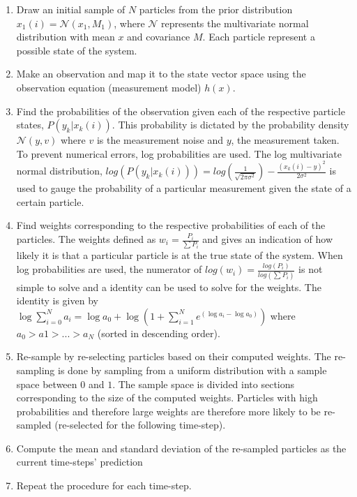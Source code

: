 \begin{enumerate}
	\item Draw an initial sample of $N$ particles from the prior distribution $x_1(i) = \mathcal{N}(x_1,M_1)$, where $\mathcal{N}$ represents the multivariate normal distribution with mean $x$ and covariance $M$. Each particle represent a possible state of the system. 
	\item Make an observation and map it to the state vector space using the observation equation (measurement model) $h(x)$.
	\item Find the probabilities of the observation given each of the respective particle states, $P(y_k | x_k(i))$. This probability is dictated by the probability density $\mathcal{N}(y,v)$ where $v$ is the measurement noise and $y$, the measurement taken. To prevent numerical errors, log probabilities are used. The log multivariate normal distribution, $log(P(y_k|x_k(i)))=log(\frac{1}{\sqrt{2\pi \sigma ^2}}) - \frac{(x_k(i)-y)^2}{2\sigma^2}$ is used to gauge the probability of a particular measurement given the state of a certain particle.
	\item \label{initially} Find weights corresponding to the respective probabilities of each of the particles. The weights defined as $w_i = \frac{P_i}{\sum P_i}$ and gives an indication of how likely it is that a particular particle is at the true state of the system. When log probabilities are used, the numerator of $log(w_i) = \frac{log(P_i)}{log(\sum P_i)}$ is not simple to solve and a identity can be used to solve for the weights. The identity is given by $\log \sum_{i=0}^{N} a_{i} = \log a_{0}+\log \left(1+\sum_{i=1}^{N} e^{\left(\log a_{i}-\log a_{0}\right)}\right)$ where $a_0>a1>...>a_N$ (sorted in descending order). 
	\item Re-sample by re-selecting particles based on their computed weights. The re-sampling is done by sampling from a uniform distribution with a sample space between $0$ and $1$. The sample space is divided into sections corresponding to the size of the computed weights. Particles with high probabilities and therefore large weights are therefore more likely to be re-sampled (re-selected for the following time-step). 
	\item Compute the mean and standard deviation of the re-sampled particles as the current time-steps' prediction
	\item Repeat the procedure for each time-step. 
\end{enumerate} 

